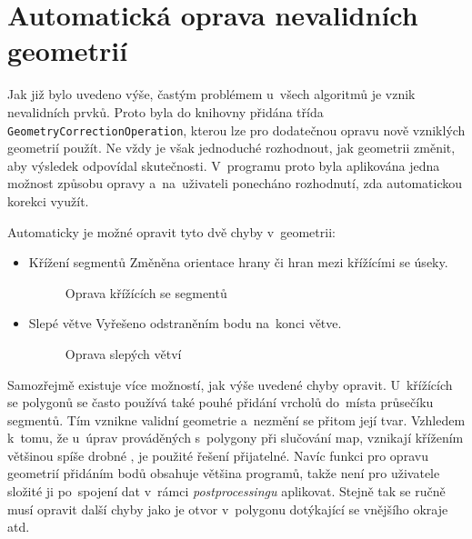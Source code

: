 \section{Automatická oprava nevalidních geometrií}
\label{problemy-opravy}

Jak již bylo uvedeno výše, častým problémem u~všech algoritmů je vznik
nevalidních prvků. Proto byla do knihovny  přidána třída
\texttt{Geometry\-Correction\-Operation}, kterou lze pro dodatečnou 
opravu nově vzniklých geometrií použít. Ne vždy je však jednoduché 
rozhodnout, jak geometrii změnit, aby výsledek odpovídal skutečnosti. 
V~programu proto byla aplikována jedna možnost způsobu opravy 
a~na~uživateli ponecháno rozhodnutí, zda automatickou korekci využít.

Automaticky je možné opravit tyto dvě chyby v~geometrii:

\begin{itemize}
 \item Křížení segmentů
	\subitem Změněna orientace hrany či hran mezi křížícími se úseky.
\label{crospic}
  \begin{figure}[hbt]
    \centering
      
      \caption{Oprava křížících se segmentů}
      \label{fig:crossing}
  \end{figure}

 \item Slepé větve
	\subitem Vyřešeno odstraněním bodu na~konci větve.

\label{deadpic}
  \begin{figure}[hbt]
    \centering
      
      \caption{Oprava slepých větví}
      \label{fig:dead-branch}
  \end{figure}
\end{itemize}

Samozřejmě existuje více možností, jak výše uvedené chyby opravit.
U~křížících se polygonů se často používá také pouhé přidání vrcholů
do~místa průsečíku segmentů. Tím vznikne validní geometrie a~nezmění
se přitom její tvar. Vzhledem k~tomu, že u~úprav prováděných 
s~polygony při slučování map, vznikají křížením většinou spíše drobné
, je použité řešení přijatelné. Navíc funkci pro opravu
geometrií přidáním bodů obsahuje většina  programů, takže není
pro uživatele složité ji po~spojení dat v~rámci \textit{postprocessingu}
aplikovat. Stejně tak se ručně musí opravit další chyby jako je 
otvor v~polygonu dotýkající se vnějšího okraje atd.
